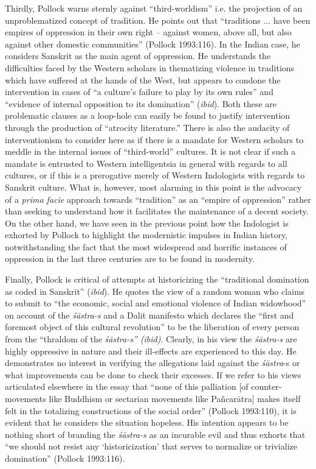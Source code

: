 Thirdly, Pollock warns sternly against “third-worldism” i.e. the projection of an unproblematized concept of tradition. He points out that “traditions $\ldots$ have been empires of oppression in their own right – against women, above all, but also against other domestic communities” (Pollock 1993:116). In the Indian case, he considers Sanskrit as the main agent of oppression. He understands the difficulties faced by the Western scholars in thematizing violence in traditions which have suffered at the hands of the West, but appears to condone the intervention in cases of “a culture’s failure to play by its own rules” and “evidence of internal opposition to its domination” ({\sl ibid}). Both these are problematic clauses as a loop-hole can easily be found to justify intervention through the production of “atrocity literature.” There is also the audacity of interventionism to consider here as if there is a mandate for Western scholars to meddle in the internal issues of “third-world” cultures. It is not clear if such a mandate is entrusted to Western intelligentsia in general with regards to all cultures, or if this is a prerogative merely of Western Indologists with regards to Sanskrit culture. What is, however, most alarming in this point is the advocacy of a {\sl prima facie} approach towards “tradition” as an “empire of oppression” rather than seeking to understand how it facilitates the maintenance of a decent society. On the other hand, we have seen in the previous point how the Indologist is exhorted by Pollock to highlight the modernistic impulses in Indian history, notwithstanding the fact that the most widespread and horrific instances of oppression in the last three centuries are to be found in modernity.

Finally, Pollock is critical of attempts at historicizing the “traditional domination as coded in Sanskrit” ({\sl ibid}). He quotes the view of a random woman who claims to submit to “the economic, social and emotional violence of Indian widowhood” on account of the {\sl śāstra-s} and a Dalit manifesto which declares the “first and foremost object of this cultural revolution” to be the liberation of every person from the “thraldom of the {\sl śāstra-s” (ibid)}. Clearly, in his view the {\sl śāstra-s} are highly oppressive in nature and their ill-effects are experienced to this day. He demonstrates no interest in verifying the allegations laid against the {\sl śāstra}-s or what improvements can be done to check their excesses. If we refer to his views articulated elsewhere in the essay that “none of this palliation [of counter-movements like Buddhism or sectarian movements like Pañcarātra] makes itself felt in the totalizing constructions of the social order” (Pollock 1993:110), it is evident that he considers the situation hopeless. His intention appears to be nothing short of branding the {\sl śāstra-s} as an incurable evil and thus exhorts that “we should not resist any ‘historicization’ that serves to normalize or trivialize domination” (Pollock 1993:116).

